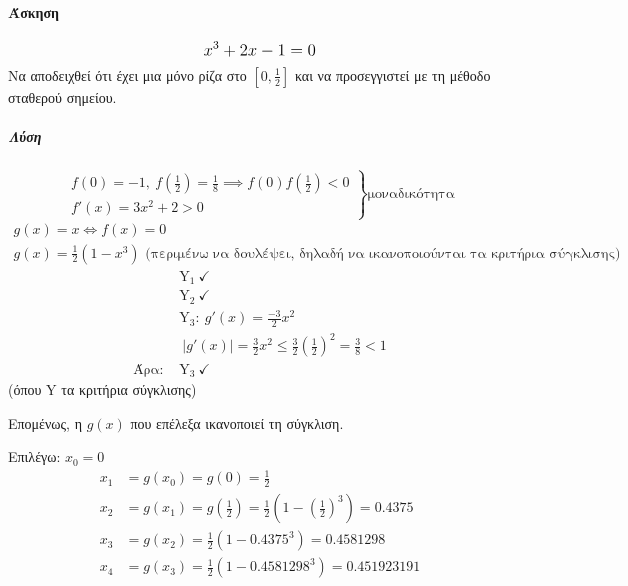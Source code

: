 \documentclass[11pt,a4paper,notitlepage,fleqn,final]{article}
\begin{document}
	\paragraph{Άσκηση}
	\[
	\mathlarger{x^3+2x-1=0}
	\]
	Να αποδειχθεί ότι έχει μια μόνο ρίζα στο \( \left[0,\frac{1}{2}\right] \) και
	να προσεγγιστεί με τη μέθοδο σταθερού σημείου.
	\subparagraph{Λύση}
	\[ \left.
	\begin{array}{l}
	f(0) = -1,\ f\left(\frac{1}{2}\right) = \frac{1}{8} \implies
	f(0)f\left(\frac{1}{2}\right) < 0 \\
	f'(x) = 3x^2 + 2 > 0
	\end{array} \right\rbrace \text{μοναδικότητα}
	\]
	\begin{gather*}
	g(x) = x \iff f(x) = 0 \\
	g(x) = \frac{1}{2} (1-x^3) \text{ (περιμένω να δουλέψει, δηλαδή να ικανοποιούνται
		τα κριτήρια σύγκλισης)}
	\end{gather*}
	\begin{align*}
		&\mathrm Y_1 \ \checkmark \\
		&\mathrm Y_2 \ \checkmark \\
		&\mathrm Y_3:\ g'(x) = \frac{-3}{2} x^2 \\
		&\ \left|g'(x)\right| = \frac{3}{2} x^2 \leq \frac{3}{2}\left(\frac{1}{2}\right)^2
		= \frac{3}{8} < 1 \\
		\text{Άρα: } & \mathrm Y_3 \ \checkmark
	\end{align*}
	(όπου \( \mathrm Y \) τα κριτήρια σύγκλισης)

	Επομένως, η \( g(x) \) που επέλεξα ικανοποιεί τη σύγκλιση.

	Επιλέγω: \( x_0 = 0 \)
	\begin{align*}
		x_1 &= g(x_0) = g(0) = \frac{1}{2} \\
		x_2 &= g(x_1) = g\left(\frac{1}{2}\right) = \frac{1}{2}\left(
		1-\left(\frac{1}{2}\right)^3
		\right) = 0.4375 \\
		x_3 &= g(x_2) = \frac{1}{2} \left(1 - 0.4375^3\right) = 0.4581298 \\
		x_4 &= g(x_3) = \frac{1}{2} \left(1-0.4581298^3\right) = 0.451923191
	\end{align*}
\end{document}
